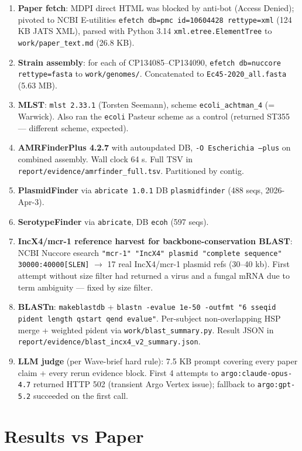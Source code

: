 \documentclass[11pt]{article}
\begin{document}
\begin{enumerate}
  \item \textbf{Paper fetch}: MDPI direct HTML was blocked by anti-bot (Access Denied); pivoted to NCBI E-utilities \texttt{efetch db=pmc id=10604428 rettype=xml} (124 KB JATS XML), parsed with Python 3.14 \texttt{xml.etree.ElementTree} to \texttt{work/paper\_text.md} (26.8 KB).
  \item \textbf{Strain assembly}: for each of CP134085--CP134090, \texttt{efetch db=nuccore rettype=fasta} to \texttt{work/genomes/}. Concatenated to \texttt{Ec45-2020\_all.fasta} (5.63 MB).
  \item \textbf{MLST}: \texttt{mlst 2.33.1} (Torsten Seemann), scheme \texttt{ecoli\_achtman\_4} (= Warwick). Also ran the \texttt{ecoli} Pasteur scheme as a control (returned ST355 --- different scheme, expected).
  \item \textbf{AMRFinderPlus 4.2.7} with autoupdated DB, \texttt{-O Escherichia --plus} on combined assembly. Wall clock 64 s. Full TSV in \texttt{report/evidence/amrfinder\_full.tsv}. Partitioned by contig.
  \item \textbf{PlasmidFinder} via \texttt{abricate 1.0.1} DB \texttt{plasmidfinder} (488 seqs, 2026-Apr-3).
  \item \textbf{SerotypeFinder} via \texttt{abricate}, DB \texttt{ecoh} (597 seqs).
  \item \textbf{IncX4/mcr-1 reference harvest for backbone-conservation BLAST}: NCBI Nuccore esearch \verb|"mcr-1" "IncX4" plasmid "complete sequence" 30000:40000[SLEN]| $\to$ 17 real IncX4/mcr-1 plasmid refs (30--40 kb). First attempt without size filter had returned a virus and a fungal mRNA due to term ambiguity --- fixed by size filter.
  \item \textbf{BLASTn}: \texttt{makeblastdb} + \texttt{blastn -evalue 1e-50 -outfmt "6 sseqid pident length qstart qend evalue"}. Per-subject non-overlapping HSP merge + weighted pident via \texttt{work/blast\_summary.py}. Result JSON in \texttt{report/evidence/blast\_incx4\_v2\_summary.json}.
  \item \textbf{LLM judge} (per Wave-brief hard rule): 7.5 KB prompt covering every paper claim + every rerun evidence block. First 4 attempts to \texttt{argo:claude-opus-4.7} returned HTTP 502 (transient Argo Vertex issue); fallback to \texttt{argo:gpt-5.2} succeeded on the first call.
\end{enumerate}

\section{Results vs Paper}
\label{sec:results}
\end{document}
